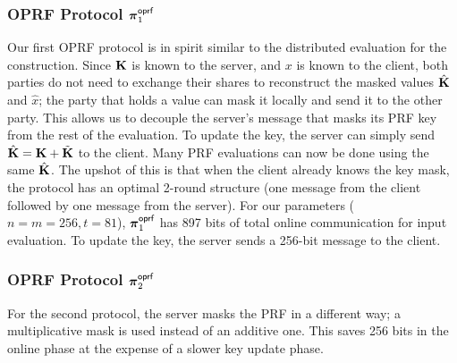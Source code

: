 \subsubsection{OPRF Protocol $\boldsymbol{\pi}^{\textsf{oprf}}_1$}
\label{subsec:oprf1}
Our first OPRF protocol is in spirit similar to the distributed evaluation for the \ttwPRF construction. Since $\mat{K}$ is known to the server, and $x$ is known to the client, both parties do not need to exchange their shares to reconstruct the masked values $\hat{\mat{K}}$ and $\hat{x}$; the party that holds a value can mask it locally and send it to the other party. This allows us to decouple the server's message that masks its PRF key from the rest of the evaluation. To update the key, the server can simply send $\hat{\mat{K}} = \mat{K} + \tilde{\mat{K}}$ to the client. Many PRF evaluations can now be done using the same $\hat{\mat{K}}$. The upshot of this is that when the client already knows the key mask, the protocol has an optimal 2-round structure (one message from the client followed by one message from the server). For our parameters ($n = m = 256,t = 81$), $\boldsymbol{\pi}^{\textsf{oprf}}_1$ has 897 bits of total online communication for input evaluation. To update the key, the server sends a 256-bit message to the client.

\subsubsection{OPRF Protocol $\boldsymbol{\pi}^{\textsf{oprf}}_2$}
\label{subsec:oprf2}
For the second protocol, the server masks the PRF in a different way; a multiplicative mask is used instead of an additive one. This saves 256 bits in the online phase at the expense of a slower key update phase.
\fi

